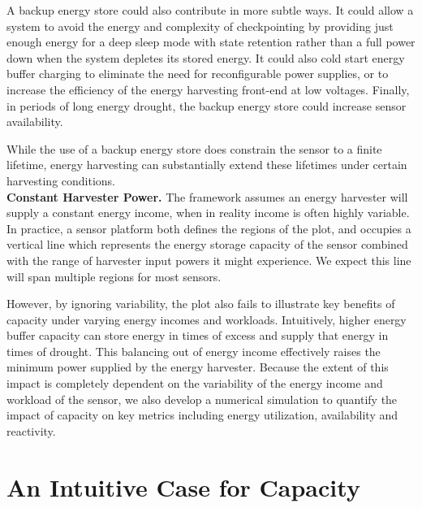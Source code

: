 A backup energy store could also contribute in more subtle ways. It could
allow a system to avoid the energy and complexity of checkpointing by
providing just enough energy for a deep sleep mode with state retention rather
than a full power down when the system depletes its stored energy. It could also
cold start energy buffer charging to eliminate the need for reconfigurable
power supplies, or to increase the efficiency of
the energy harvesting front-end at low voltages.
Finally, in periods of long energy drought, the backup energy store could increase
sensor availability.

While the use of a backup energy store
does constrain the sensor to a finite lifetime,
energy harvesting can substantially extend these lifetimes under certain harvesting
conditions.\\

\vspace{-6pt}
\noindent
\textbf{Constant Harvester Power.}
The framework assumes an energy harvester will supply a constant energy
income, when in reality income is often highly variable. In practice, a sensor
platform both defines the regions of the plot, and occupies a
vertical line which represents the energy storage capacity of the sensor
combined with the range of harvester input powers it might experience. We expect
this line will span multiple regions for most sensors.

However, by ignoring variability, the plot also fails to illustrate key benefits
of capacity under varying energy incomes and workloads. Intuitively,
higher energy buffer capacity can store energy in times of excess and supply
that energy in times of drought. This balancing out of energy income
effectively raises the minimum power supplied by the energy harvester.
Because the extent of this impact is completely dependent on the variability
of the energy income and workload of the sensor, we also develop a numerical simulation to
quantify the impact of capacity
on key metrics including energy utilization, availability and reactivity.

\section{An Intuitive Case for Capacity}

